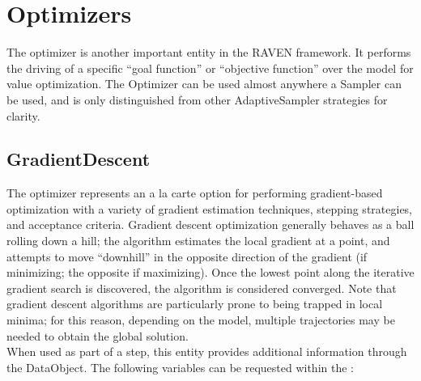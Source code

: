    \section{Optimizers} \label{sec:Optimizers} The optimizer is another important entity in the
  RAVEN framework. It performs the driving of a specific ``goal function'' or ``objective function''
  over the model for value optimization. The Optimizer can be used almost anywhere a Sampler can be
  used, and is only distinguished from other AdaptiveSampler strategies for clarity.

\subsection{GradientDescent}
  The  optimizer represents an a la carte option
  for performing gradient-based optimization with a variety of gradient
  estimation techniques, stepping strategies, and acceptance criteria. \hspace{12pt}
  Gradient descent optimization generally behaves as a ball rolling down a hill;
  the algorithm estimates the local gradient at a point, and attempts to move
  ``downhill'' in the opposite direction of the gradient (if minimizing; the
  opposite if maximizing). Once the lowest point along the iterative gradient search
  is discovered, the algorithm is considered converged. \hspace{12pt}
  Note that gradient descent algorithms are particularly prone to being trapped
  in local minima; for this reason, depending on the model, multiple trajectories
  may be needed to obtain the global solution.
\vspace{7pt} \\When used as part of a  step, this entity provides
        additional information through the  DataObject. The
        following variables can be requested within the :
